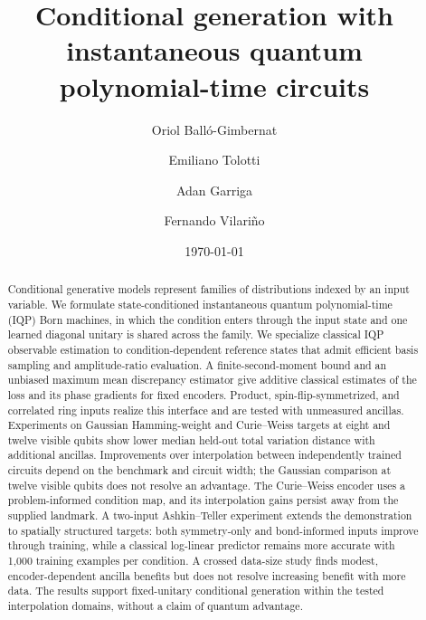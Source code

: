 \documentclass[pra,aps,10pt,twocolumn,floatfix,superscriptaddress,
notitlepage,longbibliography]{revtex4-2}
\begin{document}
\title{Conditional generation with instantaneous quantum polynomial-time circuits}

\author{Oriol Balló-Gimbernat}

\author{Emiliano Tolotti}

\author{Adan Garriga}

\author{Fernando Vilariño}

\date{\today}

\begin{abstract}
Conditional generative models represent families of distributions indexed by an input variable. We formulate state-conditioned instantaneous quantum polynomial-time (IQP) Born machines, in which the condition enters through the input state and one learned diagonal unitary is shared across the family. We specialize classical IQP observable estimation to condition-dependent reference states that admit efficient basis sampling and amplitude-ratio evaluation. A finite-second-moment bound and an unbiased maximum mean discrepancy estimator give additive classical estimates of the loss and its phase gradients for fixed encoders. Product, spin-flip-symmetrized, and correlated ring inputs realize this interface and are tested with unmeasured ancillas. Experiments on Gaussian Hamming-weight and Curie--Weiss targets at eight and twelve visible qubits show lower median held-out total variation distance with additional ancillas. Improvements over interpolation between independently trained circuits depend on the benchmark and circuit width; the Gaussian comparison at twelve visible qubits does not resolve an advantage. The Curie--Weiss encoder uses a problem-informed condition map, and its interpolation gains persist away from the supplied landmark. A two-input Ashkin--Teller experiment extends the demonstration to spatially structured targets: both symmetry-only and bond-informed inputs improve through training, while a classical log-linear predictor remains more accurate with 1,000 training examples per condition. A crossed data-size study finds modest, encoder-dependent ancilla benefits but does not resolve increasing benefit with more data. The results support fixed-unitary conditional generation within the tested interpolation domains, without a claim of quantum advantage.
\end{abstract}
\end{document}
